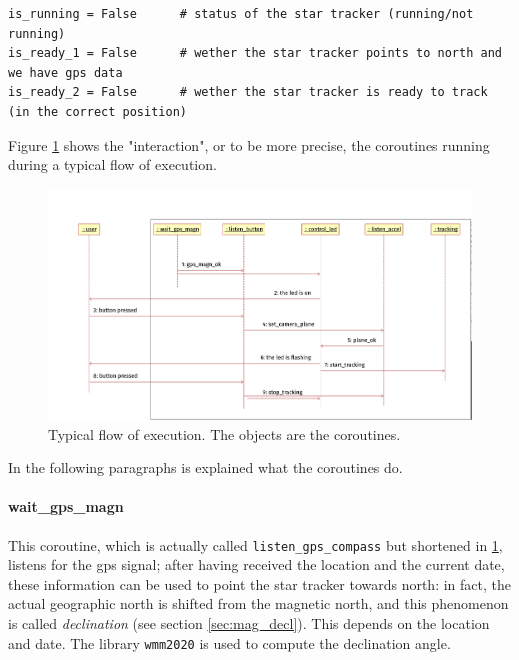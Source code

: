 \documentclass[]{article}
\begin{document}
\begin{lstlisting}[language=PythonPlus, label={lst:globvar}, caption=Global variables used to coordinate the tasks]
is_running = False      # status of the star tracker (running/not running)
is_ready_1 = False      # wether the star tracker points to north and we have gps data
is_ready_2 = False      # wether the star tracker is ready to track (in the correct position)
\end{lstlisting}

Figure \ref{fig:mainsequence} shows the "interaction", or to be more precise, the coroutines running during a typical flow of execution.

\begin{figure}[h]
	\centering
	\includegraphics[width=\linewidth]{images/software/main_sequence.png}
	\caption{Typical flow of execution. The objects are the coroutines.}
	\label{fig:mainsequence}
\end{figure}

In the following paragraphs is explained what the coroutines do.

\paragraph{wait\_gps\_magn} This coroutine, which is actually called \texttt{listen\_gps\_compass} but shortened in \ref{fig:mainsequence}, listens for the gps signal; after having received the location and the current date, these information can be used to point the star tracker towards north: in fact, the actual geographic north is shifted from the magnetic north, and this phenomenon is called \textit{declination} (see section \ref{sec:mag_decl}). This depends on the location and date. The library \texttt{wmm2020} \cite{wmm2020} is used to compute the declination angle.
\end{document}

